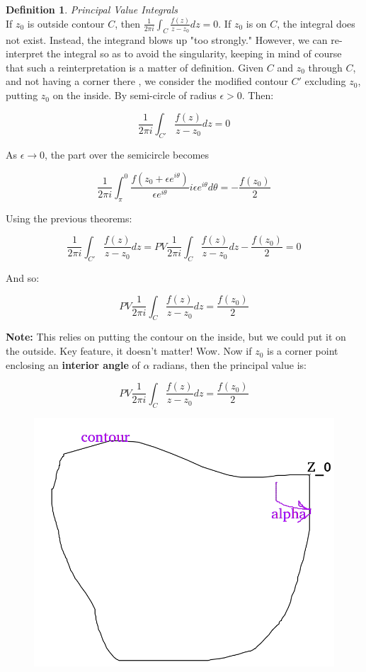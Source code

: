 \documentclass{article}
\theoremstyle{definition}
\newtheorem{definition}{Definition}[section]
\newcommand{\Def}[2]{
\begin{shaded*}
\begin{definition}{\textit{#1}}\\#2\end{definition}
\end{shaded*}
}
\begin{document}
\Def{Principal Value Integrals}{
If $z_0$ is outside contour $C$, then $\frac{1}{2\pi i}\int_{C} \frac{f(z)}{z-z_0}dz = 0$. If $z_0$ is on $C$, the integral does not exist. Instead, the integrand blows up "too strongly." However, we can re-interpret the integral so as to avoid the singularity, keeping in mind of course that such a reinterpretation is a matter of definition. Given $C$ and $z_0$ through $C$, and not having a corner there , we consider the modified contour $C'$ excluding $z_0$, putting $z_0$ on the inside. By semi-circle of radius $\epsilon>0$. Then:

$$\frac{1}{2\pi i}\int_{C'} \frac{f(z)}{z-z_0}dz = 0$$

As $\epsilon \to 0$, the part over the semicircle becomes 

$$\frac{1}{2\pi i}\int_{\pi}^0 \frac{f(z_0 + \epsilon e^{i\theta})}{\epsilon e^{i\theta}} i \epsilon e^{i\theta} d\theta = -\frac{f(z_0)}{2}$$

Using the previous theorems:

$$\frac{1}{2\pi i}\int_{C'} \frac{f(z)}{z-z_0}dz = PV \frac{1}{2\pi i}\int_{C} \frac{f(z)}{z-z_0}dz -\frac{f(z_0)}{2} =  0$$

And so:

$$PV \frac{1}{2\pi i}\int_{C} \frac{f(z)}{z-z_0}dz = \frac{f(z_0)}{2}$$

\textbf{Note:} This relies on putting the contour on the inside, but we could put it on the outside. Key feature, it doesn't matter! Wow. Now if $z_0$ is a corner point enclosing an \textbf{interior angle} of $\alpha$ radians, then the principal value is:

$$PV \frac{1}{2\pi i}\int_{C} \frac{f(z)}{z-z_0}dz = \frac{f(z_0)}{2}$$

\begin{figure}[H]
	\centering
	\includegraphics[width=0.5\linewidth]{angle_contour}
	\caption{}
	\label{fig:anglecontour}
\end{figure}

}
\end{document}
